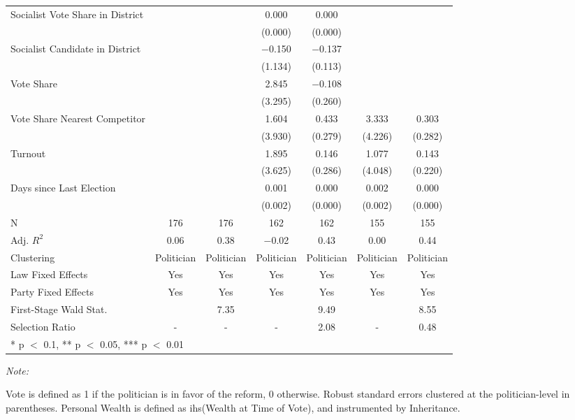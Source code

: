 \begin{table}[!h]
{\begin{threeparttable}
\begin{tabular}[t]{lcccccc}
Socialist Vote Share in District &  &  & \num{0.000} & \num{0.000} &  & \\
 &  &  & (\num{0.000}) & (\num{0.000}) &  & \\
Socialist Candidate in District &  &  & \num{-0.150} & \num{-0.137} &  & \\
 &  &  & (\num{1.134}) & (\num{0.113}) &  & \\
Vote Share &  &  & \num{2.845} & \num{-0.108} &  & \\
 &  &  & (\num{3.295}) & (\num{0.260}) &  & \\
Vote Share Nearest Competitor &  &  & \num{1.604} & \num{0.433} & \num{3.333} & \num{0.303}\\
 &  &  & (\num{3.930}) & (\num{0.279}) & (\num{4.226}) & (\num{0.282})\\
Turnout &  &  & \num{1.895} & \num{0.146} & \num{1.077} & \num{0.143}\\
 &  &  & (\num{3.625}) & (\num{0.286}) & (\num{4.048}) & (\num{0.220})\\
Days since Last Election &  &  & \num{0.001} & \num{0.000} & \num{0.002} & \num{0.000}\\
 &  &  & (\num{0.002}) & (\num{0.000}) & (\num{0.002}) & (\num{0.000})\\
\midrule
N & \num{176} & \num{176} & \num{162} & \num{162} & \num{155} & \num{155}\\
Adj. $R^2$ & \num{0.06} & \num{0.38} & \num{-0.02} & \num{0.43} & \num{0.00} & \num{0.44}\\
Clustering & Politician & Politician & Politician & Politician & Politician & Politician\\
Law Fixed Effects & Yes & Yes & Yes & Yes & Yes & Yes\\
Party Fixed Effects & Yes & Yes & Yes & Yes & Yes & Yes\\
First-Stage Wald Stat. &  & 7.35 &  & 9.49 &  & 8.55\\
Selection Ratio & - & - & - & 2.08 & - & 0.48\\
\bottomrule
\multicolumn{7}{l}{\rule{0pt}{1em}* p $<$ 0.1, ** p $<$ 0.05, *** p $<$ 0.01}\\
\end{tabular}
\begin{tablenotes}[para]
\item \textit{Note: } 
\item Vote is defined as 1 if the politician is in favor of the reform, 0 otherwise. Robust standard errors clustered at the politician-level in parentheses. Personal Wealth is defined as ihs(Wealth at Time of Vote), and instrumented by Inheritance.
\end{tablenotes}
\end{threeparttable}}
\end{table}
